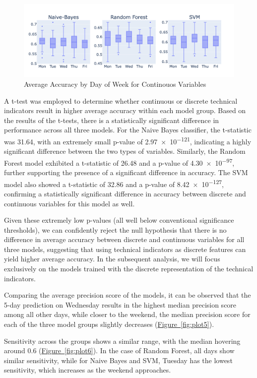 \documentclass[aodsor,preprint]{imsart}
\numberwithin{equation}{section}
\theoremstyle{plain}
\begin{document}
\begin{figure}[H]
  \centering
  \includegraphics[width=\textwidth]{plots/accuracy_discrete.png}
  \caption{Average Accuracy by Day of Week for Continouos Variables}
  \label{fig:plot4}
\end{figure}

A t-test was employed to determine whether continuous or discrete technical indicators result in higher average accuracy within each model group. Based on the results of the t-tests, there is a statistically significant difference in performance across all three models. For the Naive Bayes classifier, the t-statistic was 31.64, with an extremely small p-value of \num{2.97e-121}, indicating a highly significant difference between the two types of variables. Similarly, the Random Forest model exhibited a t-statistic of 26.48 and a p-value of \num{4.30e-97}, further supporting the presence of a significant difference in accuracy. The SVM model also showed a t-statistic of 32.86 and a p-value of \num{8.42e-127}, confirming a statistically significant difference in accuracy between discrete and continuous variables for this model as well.

Given these extremely low p-values (all well below conventional significance thresholds), we can confidently reject the null hypothesis that there is no difference in average accuracy between discrete and continuous variables for all three models, suggesting that using technical indicators as discrete features can yield higher average accuracy. In the subsequent analysis, we will focus exclusively on the models trained with the discrete representation of the technical indicators.

Comparing the average precision score of the models, it can be observed that the 5-day prediction on Wednesday results in the highest median precision score among all other days, while closer to the weekend, the median precision score for each of the three model groups slightly decreases (\hyperref[fig:plot5]{Figure~\ref*{fig:plot5}}).

Sensitivity across the groups shows a similar range, with the median hovering around 0.6 (\hyperref[fig:plot6]{Figure~\ref*{fig:plot6}}). In the case of Random Forest, all days show similar sensitivity, while for Naive Bayes and SVM, Tuesday has the lowest sensitivity, which increases as the weekend approaches.
\end{document}
